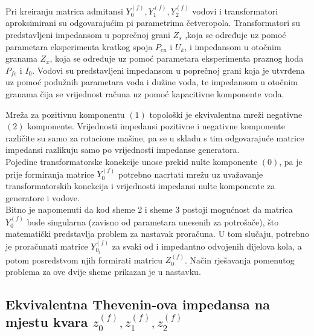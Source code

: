 \documentclass[a4paper, 12pt]{article}
\numberwithin{figure}{section}
\numberwithin{equation}{section}
\begin{document}
Pri kreiranju matrica admitansi $Y^{(f)}_{0}, Y^{(f)}_{1}, Y^{(f)}_{2}$ vodovi i transformatori aproksimirani su odgovarajućim pi parametrima četveropola. Transformatori su predstavljeni impedansom u poprečnoj grani  $Z_{s}$ ,koja se određuje uz pomoć parametara eksperimenta kratkog spoja $P_{cu}$ i $U_{k}$, i impedansom u otočnim granama $Z_{x}$, koja se određuje uz pomoć parametara eksperimenta praznog hoda $P_{fe}$ i $I_{0}$. Vodovi su predstavljeni impedansom u poprečnoj grani koja je utvrđena uz pomoć podužnih parametara voda i dužine voda, te impedansom u otočnim granama čija se vrijednost računa uz pomoć kapacitivne komponente voda.

Mreža za pozitivnu komponentu $(1)$ topološki je ekvivalentna mreži negativne $(2)$ komponente. Vrijednosti impedansi pozitivne i negativne komponente različite su samo za rotacione mašine, pa se u skladu s tim odgovarajuće matrice impedansi razlikuju samo po vrijednosti impedanse generatora. \\

Pojedine transformatorske konekcije unose prekid nulte komponente $(0)$, pa je prije formiranja matrice $Y^{(f)}_{0}$ potrebno nacrtati mrežu uz uvažavanje transformatorskih konekcija i vrijednosti impedansi nulte komponente za generatore i vodove. \\



Bitno je napomenuti da kod sheme 2 i sheme 3 postoji mogućnost da matrica $Y^{(f)}_{0}$ bude singularna (zavisno od parametara unesenih za potrošače), što matematički predstavlja problem za nastavak proračuna. U tom slučaju, potrebno je proračunati matrice $Y^{(f)}_{0_i}$ za svaki od i impedantno odvojenih dijelova kola, a potom posredstvom njih formirati matricu $Z^{(f)}_{0}$. Način rješavanja pomenutog problema za ove dvije sheme prikazan je u nastavku. \\




\subsection{Ekvivalentna Thevenin-ova impedansa na mjestu kvara $z^{(f)}_{0}, z^{(f)}_{1}, z^{(f)}_{2}$}


\end{document}
